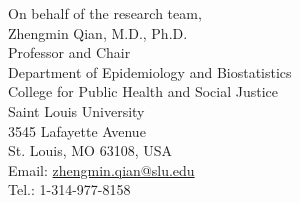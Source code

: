 \documentclass[10pt]{article}
\begin{document}
\vspace*{\fill}


On behalf of the research team,\\


Zhengmin Qian, M.D., Ph.D.\\
Professor and Chair\\
Department of Epidemiology and Biostatistics\\
College for Public Health and Social Justice\\
Saint Louis University\\
3545 Lafayette Avenue\\
St. Louis, MO 63108, USA\\
Email: \href{mailto:zhengmin.qian@slu.edu}{zhengmin.qian@slu.edu}\\
Tel.: 1-314-977-8158
\end{document}
